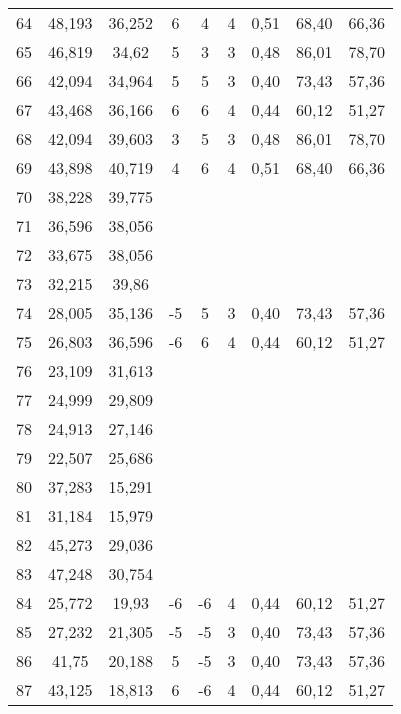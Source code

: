 \begin{table}[h]
\begin{tabular}{ccccccccc}
64 & 48,193 & 36,252 & 6 & 4 & 4 & 0,51 & 68,40 & 66,36\\
65 & 46,819 & 34,62 & 5 & 3 & 3 & 0,48 & 86,01 & 78,70\\
66 & 42,094 & 34,964 & 5 & 5 & 3 & 0,40 & 73,43 & 57,36\\
67 & 43,468 & 36,166 & 6 & 6 & 4 & 0,44 & 60,12 & 51,27\\
68 & 42,094 & 39,603 & 3 & 5 & 3 & 0,48 & 86,01 & 78,70\\
69 & 43,898 & 40,719 & 4 & 6 & 4 & 0,51 & 68,40 & 66,36\\
70 & 38,228 & 39,775 &  &  &  &  &  & \\
71 & 36,596 & 38,056 &  &  &  &  &  & \\
72 & 33,675 & 38,056 &  &  &  &  &  & \\
73 & 32,215 & 39,86 &  &  &  &  &  & \\
74 & 28,005 & 35,136 & -5 & 5 & 3 & 0,40 & 73,43 & 57,36\\
75 & 26,803 & 36,596 & -6 & 6 & 4 & 0,44 & 60,12 & 51,27\\
76 & 23,109 & 31,613 &  &  &  &  &  & \\
77 & 24,999 & 29,809 &  &  &  &  &  & \\
78 & 24,913 & 27,146 &  &  &  &  &  & \\
79 & 22,507 & 25,686 &  &  &  &  &  & \\
80 & 37,283 & 15,291 &  &  &  &  &  & \\
81 & 31,184 & 15,979 &  &  &  &  &  & \\
82 & 45,273 & 29,036 &  &  &  &  &  & \\
83 & 47,248 & 30,754 &  &  &  &  &  & \\
84 & 25,772 & 19,93 & -6 & -6 & 4 & 0,44 & 60,12 & 51,27\\
85 & 27,232 & 21,305 & -5 & -5 & 3 & 0,40 & 73,43 & 57,36\\
86 & 41,75 & 20,188 & 5 & -5 & 3 & 0,40 & 73,43 & 57,36\\
87 & 43,125 & 18,813 & 6 & -6 & 4 & 0,44 & 60,12 & 51,27\\
\bottomrule
\end{tabular}
\end{table}

